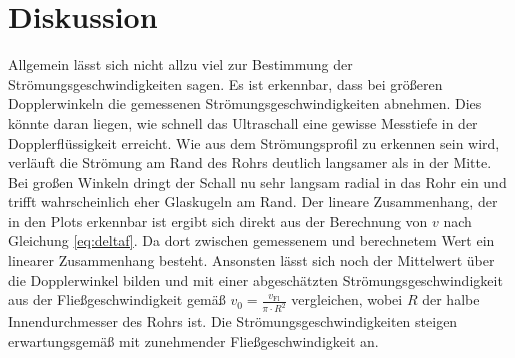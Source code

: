 \section{Diskussion}
Allgemein lässt sich nicht allzu viel zur Bestimmung der Strömungsgeschwindigkeiten sagen.
Es ist erkennbar, dass bei größeren Dopplerwinkeln die gemessenen Strömungsgeschwindigkeiten abnehmen. Dies könnte daran liegen, wie schnell das Ultraschall 
eine gewisse Messtiefe in der Dopplerflüssigkeit erreicht. Wie aus dem Strömungsprofil zu erkennen sein wird, verläuft die Strömung am Rand des Rohrs deutlich langsamer als in der Mitte.
Bei großen Winkeln dringt der Schall nu sehr langsam radial in das Rohr ein und trifft wahrscheinlich eher Glaskugeln am Rand.
Der lineare Zusammenhang, der in den Plots erkennbar ist ergibt sich direkt aus der Berechnung von $v$ nach Gleichung \eqref{eq:deltaf}. Da dort zwischen gemessenem und
berechnetem Wert ein linearer Zusammenhang besteht.
Ansonsten lässt sich noch der Mittelwert über die Dopplerwinkel bilden und mit einer abgeschätzten Strömungsgeschwindigkeit aus 
der Fließgeschwindigkeit gemäß $v_0=\frac{v_{\text{Fl}}}{\pi \cdot R^2}$ vergleichen, wobei $R$ der halbe Innendurchmesser des Rohrs ist.
Die Strömungsgeschwindigkeiten steigen erwartungsgemäß mit zunehmender Fließgeschwindigkeit an. 
\label{sec:Diskussion}
